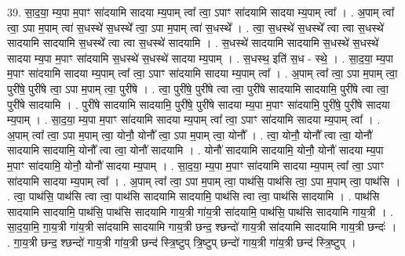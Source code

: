 \documentclass[17pt]{extarticle}
\begin{document}
39. सा॒द॒या॒ म्य॒पा म॒पाꣳ सा॑दयामि सादया म्य॒पाम् त्वा᳚ त्वा॒ ऽपाꣳ सा॑दयामि सादया म्य॒पाम् त्वा᳚ । . अ॒पाम् त्वा᳚ त्वा॒ ऽपा म॒पाम् त्वा॑ स॒धस्थे॑ स॒धस्थे᳚ त्वा॒ ऽपा म॒पाम् त्वा॑ स॒धस्थे᳚ । . त्वा॒ स॒धस्थे॑ स॒धस्थे᳚ त्वा त्वा स॒धस्थे॑ सादयामि सादयामि स॒धस्थे᳚ त्वा त्वा स॒धस्थे॑ सादयामि । . स॒धस्थे॑ सादयामि सादयामि स॒धस्थे॑ स॒धस्थे॑ सादया म्य॒पा म॒पाꣳ सा॑दयामि स॒धस्थे॑ स॒धस्थे॑ सादया म्य॒पाम् । . स॒धस्थ॒ इति॑ स॒ध - स्थे॒ । . सा॒द॒या॒ म्य॒पा म॒पाꣳ सा॑दयामि सादया म्य॒पाम् त्वा᳚ त्वा॒ ऽपाꣳ सा॑दयामि सादया म्य॒पाम् त्वा᳚ । . अ॒पाम् त्वा᳚ त्वा॒ ऽपा म॒पाम् त्वा॒ पुरी॑षे॒ पुरी॑षे त्वा॒ ऽपा म॒पाम् त्वा॒ पुरी॑षे । . त्वा॒ पुरी॑षे॒ पुरी॑षे त्वा त्वा॒ पुरी॑षे सादयामि सादयामि॒ पुरी॑षे त्वा त्वा॒ पुरी॑षे सादयामि । . पुरी॑षे सादयामि सादयामि॒ पुरी॑षे॒ पुरी॑षे सादया म्य॒पा म॒पाꣳ सा॑दयामि॒ पुरी॑षे॒ पुरी॑षे सादया म्य॒पाम् । . सा॒द॒या॒ म्य॒पा म॒पाꣳ सा॑दयामि सादया म्य॒पाम् त्वा᳚ त्वा॒ ऽपाꣳ सा॑दयामि सादया म्य॒पाम् त्वा᳚ । . अ॒पाम् त्वा᳚ त्वा॒ ऽपा म॒पाम् त्वा॒ योनौ॒ योनौ᳚ त्वा॒ ऽपा म॒पाम् त्वा॒ योनौ᳚ । . त्वा॒ योनौ॒ योनौ᳚ त्वा त्वा॒ योनौ॑ सादयामि सादयामि॒ योनौ᳚ त्वा त्वा॒ योनौ॑ सादयामि । . योनौ॑ सादयामि सादयामि॒ योनौ॒ योनौ॑ सादया म्य॒पा म॒पाꣳ सा॑दयामि॒ योनौ॒ योनौ॑ सादया म्य॒पाम् । . सा॒द॒या॒ म्य॒पा म॒पाꣳ सा॑दयामि सादया म्य॒पाम् त्वा᳚ त्वा॒ ऽपाꣳ सा॑दयामि सादया म्य॒पाम् त्वा᳚ । . अ॒पाम् त्वा᳚ त्वा॒ ऽपा म॒पाम् त्वा॒ पाथ॑सि॒ पाथ॑सि त्वा॒ ऽपा म॒पाम् त्वा॒ पाथ॑सि । . त्वा॒ पाथ॑सि॒ पाथ॑सि त्वा त्वा॒ पाथ॑सि सादयामि सादयामि॒ पाथ॑सि त्वा त्वा॒ पाथ॑सि सादयामि । . पाथ॑सि सादयामि सादयामि॒ पाथ॑सि॒ पाथ॑सि सादयामि गाय॒त्री गा॑य॒त्री सा॑दयामि॒ पाथ॑सि॒ पाथ॑सि सादयामि गाय॒त्री । . सा॒द॒या॒मि॒ गा॒य॒त्री गा॑य॒त्री सा॑दयामि सादयामि गाय॒त्री छन्द॒ श्छन्दो॑ गाय॒त्री सा॑दयामि सादयामि गाय॒त्री छन्दः॑ । . गा॒य॒त्री छन्द॒ श्छन्दो॑ गाय॒त्री गा॑य॒त्री छन्द॑ स्त्रि॒ष्टुप् त्रि॒ष्टुप् छन्दो॑ गाय॒त्री गा॑य॒त्री छन्द॑ स्त्रि॒ष्टुप् । \newline
\end{document}
